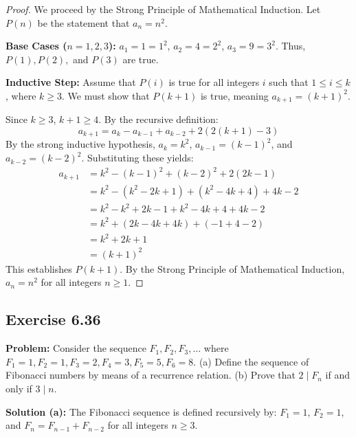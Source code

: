 \documentclass[11pt, a4paper]{article}
\theoremstyle{definition}
\theoremstyle{remark}
\begin{document}
\begin{proof}
    We proceed by the Strong Principle of Mathematical Induction. Let $P(n)$ be the statement that $a_n = n^2$.
    
    \textbf{Base Cases ($n=1, 2, 3$):}
    $a_1 = 1 = 1^2$, $a_2 = 4 = 2^2$, $a_3 = 9 = 3^2$. Thus, $P(1), P(2),$ and $P(3)$ are true.
    
    \textbf{Inductive Step:}
    Assume that $P(i)$ is true for all integers $i$ such that $1 \le i \le k$, where $k \ge 3$. We must show that $P(k+1)$ is true, meaning $a_{k+1} = (k+1)^2$.
    
    Since $k \ge 3$, $k+1 \ge 4$. By the recursive definition:
    \[ a_{k+1} = a_k - a_{k-1} + a_{k-2} + 2(2(k+1)-3) \]
    By the strong inductive hypothesis, $a_k = k^2$, $a_{k-1} = (k-1)^2$, and $a_{k-2} = (k-2)^2$. Substituting these yields:
    \begin{align*}
        a_{k+1} &= k^2 - (k-1)^2 + (k-2)^2 + 2(2k - 1) \\
        &= k^2 - (k^2 - 2k + 1) + (k^2 - 4k + 4) + 4k - 2 \\
        &= k^2 - k^2 + 2k - 1 + k^2 - 4k + 4 + 4k - 2 \\
        &= k^2 + (2k - 4k + 4k) + (-1 + 4 - 2) \\
        &= k^2 + 2k + 1 \\
        &= (k+1)^2
    \end{align*}
    This establishes $P(k+1)$. By the Strong Principle of Mathematical Induction, $a_n = n^2$ for all integers $n \ge 1$.
\end{proof}

\subsection{Exercise 6.36}
\textbf{Problem:} Consider the sequence $F_1, F_2, F_3, \dots$ where $F_1 = 1, F_2 = 1, F_3 = 2, F_4 = 3, F_5 = 5, F_6 = 8$.
(a) Define the sequence of Fibonacci numbers by means of a recurrence relation.
(b) Prove that $2 \mid F_n$ if and only if $3 \mid n$.

\textbf{Solution (a):}
The Fibonacci sequence is defined recursively by:
$F_1 = 1$, $F_2 = 1$, and $F_n = F_{n-1} + F_{n-2}$ for all integers $n \ge 3$.
\end{document}

